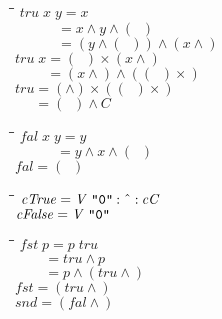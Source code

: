 \documentclass{article}
\newlength{\lwidth}\setlength{\lwidth}{4.5cm}
\newlength{\cwidth}\setlength{\cwidth}{8mm} %
\newcommand{\Conid}[1]{\mathit{#1}}
\newcommand{\Varid}[1]{\mathit{#1}}
\begin{document}
\begin{tabbing}
\qquad\=\hspace{\lwidth}\=\hspace{\cwidth}\=\+\kill
${\Varid{tru}\;\Varid{x}\;\Varid{y}\mathrel{=}\Varid{x}}$\\
${\phantom{\Varid{tru}\;\Varid{x}\;\Varid{y}\mbox{}}\mathrel{=}\Varid{x}\wedge\Varid{y}\wedge(\!\mathop{{}^{{}^{\cdot}}}\!)}$\\
${\phantom{\Varid{tru}\;\Varid{x}\;\Varid{y}\mbox{}}\mathrel{=}(\Varid{y}\wedge(\!\mathop{{}^{{}^{\cdot}}}\!))\wedge(\Varid{x}\wedge)}$\\
${\Varid{tru}\;\Varid{x}\mathrel{=}(\!\mathop{{}^{{}^{\cdot}}}\!)\times(\Varid{x}\wedge)}$\\
${\phantom{\Varid{tru}\;\Varid{x}\mbox{}}\mathrel{=}(\Varid{x}\wedge)\wedge((\!\mathop{{}^{{}^{\cdot}}}\!)\times)}$\\
${\Varid{tru}\mathrel{=}(\wedge)\times((\!\mathop{{}^{{}^{\cdot}}}\!)\times)}$\\
${\phantom{\Varid{tru}\mbox{}}\mathrel{=}(\!\mathop{{}^{{}^{\cdot}}}\!)\wedge\Conid{C}}$
\end{tabbing}
\begin{tabbing}
\qquad\=\hspace{\lwidth}\=\hspace{\cwidth}\=\+\kill
${\Varid{fal}\;\Varid{x}\;\Varid{y}\mathrel{=}\Varid{y}}$\\
${\phantom{\Varid{fal}\;\Varid{x}\;\Varid{y}\mbox{}}\mathrel{=}\Varid{y}\wedge\Varid{x}\wedge(\!\mathop{{}^{{}^{\cdot}}}\!)}$\\
${\Varid{fal}\mathrel{=}(\!\mathop{{}^{{}^{\cdot}}}\!)}$
\end{tabbing}
\begin{tabbing}
\qquad\=\hspace{\lwidth}\=\hspace{\cwidth}\=\+\kill
${\Varid{cTrue}\mathrel{=}\Conid{V}\;\text{\ttfamily \char34 0\char34}\mathbin{:\char94 :}\Varid{cC}}$\\
${\Varid{cFalse}\mathrel{=}\Conid{V}\;\text{\ttfamily \char34 0\char34}}$
\end{tabbing}
\begin{tabbing}
\qquad\=\hspace{\lwidth}\=\hspace{\cwidth}\=\+\kill
${\Varid{fst}\;\Varid{p}\mathrel{=}\Varid{p}\;\Varid{tru}}$\\
${\phantom{\Varid{fst}\;\Varid{p}\mbox{}}\mathrel{=}\Varid{tru}\wedge\Varid{p}}$\\
${\phantom{\Varid{fst}\;\Varid{p}\mbox{}}\mathrel{=}\Varid{p}\wedge(\Varid{tru}\wedge)}$\\
${\Varid{fst}\mathrel{=}(\Varid{tru}\wedge)}$\\
${\Varid{snd}\mathrel{=}(\Varid{fal}\wedge)}$
\end{tabbing}
\end{document}
